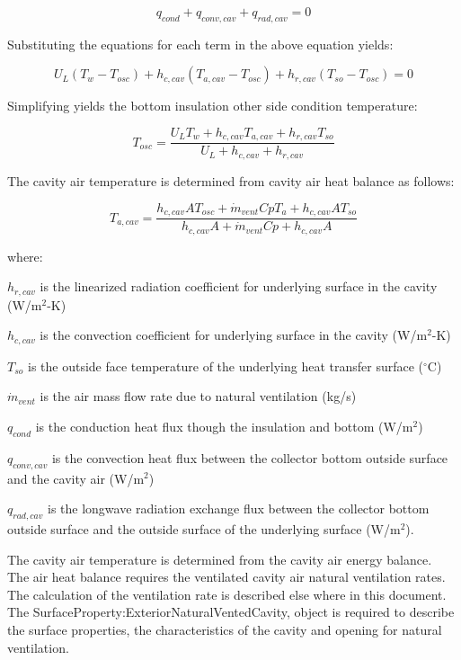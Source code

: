 \begin{equation}
{q_{cond}} + {q_{conv, cav}} + {q_{rad, cav}} = 0
\end{equation}

Substituting the equations for each term in the above equation yields:

\begin{equation}
U_L \left( T_w - T_{osc} \right) + h_{c, cav} \left( T_{a, cav} - T_{osc} \right) + h_{r, cav} \left( T_{so} - T_{osc} \right) = 0
\end{equation}

Simplifying yields the bottom insulation other side condition temperature:

\begin{equation}
{T_{osc}} = \frac{{{U_L}{T_w} + {h_{c, cav}}{T_{a, cav}} + {h_{r, cav}}{T_{so}}}}{{{U_L} + {h_{c, cav}} + {h_{r, cav}}}}
\end{equation}

The cavity air temperature is determined from cavity air heat balance as follows:

\begin{equation}
{T_{a, cav}} = \frac{{{h_{c, cav}}A{T_{osc}} + {{\dot m}_{vent}}Cp{T_a} + {h_{c, cav}}A{T_{so}}}}{{{h_{c, cav}}A + {{\dot m}_{vent}}Cp + {h_{c, cav}}A}}
\end{equation}

where:

\(h_{r,cav}\) is the linearized radiation coefficient for underlying surface in the cavity (W/m\(^{2}\)-K)

\(h_{c,cav}\) is the convection coefficient for underlying surface in the cavity (W/m\(^{2}\)-K)

\(T_{so}\) is the outside face temperature of the underlying heat transfer surface (\(^{\circ}\)C)

\({\dot m_{vent}}\) is the air mass flow rate due to natural ventilation (kg/s)

\(q_{cond}\) is the conduction heat flux though the insulation and bottom (W/m\(^{2}\))

\(q_{conv,cav}\) is the convection heat flux between the collector bottom outside surface and the cavity air (W/m\(^{2}\))

\(q_{rad,cav}\) is the longwave radiation exchange flux between the collector bottom outside surface and the outside surface of the underlying surface (W/m\(^{2}\)).

The cavity air temperature is determined from the cavity air energy balance.~ The air heat balance requires the ventilated cavity air natural ventilation rates.~ The calculation of the ventilation rate is described else where in this document. The SurfaceProperty:ExteriorNaturalVentedCavity, object is required to describe the surface properties, the characteristics of the cavity and opening for natural ventilation.

